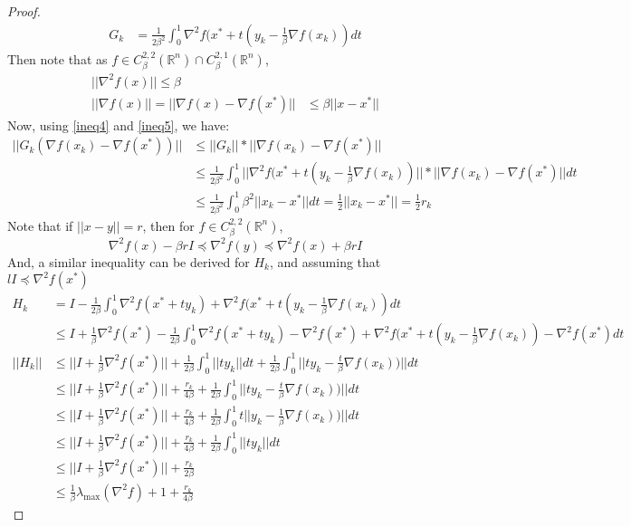 \begin{proof}
\begin{equation}
\begin{aligned}
G_k &= \frac{1}{2\beta^2} \int_0^1 \nabla^2 f(x^* + t(y_k - \frac{1}{\beta} \nabla f(x_k)) dt
\end{aligned}
\end{equation}
Then note that as $f \in C_{\beta}^{2,2}( \mathbb{R}^n) \cap  C_{\beta}^{2,1}( \mathbb{R}^n) $,
\begin{align} \label{ineq4}
|| \nabla^2 f(x) || \leq \beta \\
|| \nabla f(x) || = || \nabla f(x) - \nabla f(x^*) ||& \leq  \beta || x - x^* ||  \label{ineq5}
\end{align}
Now, using \eqref{ineq4} and \eqref{ineq5}, we have:
\begin{equation}
\begin{aligned}
|| G_k ( \nabla f(x_k)  - \nabla f(x^*) ) || &\leq || G_k ||* ||  \nabla f(x_k)  - \nabla f(x^* )|| \\
& \leq  \frac{1}{2\beta^2} \int_0^1 || \nabla^2 f(x^* + t(y_k - \frac{1}{\beta} \nabla f(x_k)) || * ||  \nabla f(x_k)  - \nabla f(x^*) ||  dt \\
& \leq \frac{1}{2 \beta^2} \int_{0}^1 \beta^2 || x_k -  x^* || dt =\frac{1}{2} || x_k - x^* ||  = \frac{1}{2} r_k
\end{aligned}
\end{equation}
Note that if $|| x -y || = r$, then for $f \in C_{\beta}^{2,2}( \mathbb{R}^n)$,
\begin{equation}
 \nabla^2 f(x) - \beta r I \preceq  \nabla^2 f(y) \preceq \nabla^2 f(x) + \beta r I
\end{equation}
And, a similar inequality can be derived for $H_k$, and assuming that $l I \preceq \nabla^2 f(x^*)$
\begin{equation}
\begin{aligned}
 H_k &= I -  \frac{1}{2\beta} \int_0^1 \nabla^2 f(x^* + ty_k) + \nabla^2 f(x^* + t(y_k - \frac{1}{\beta} \nabla f(x_k)) dt  \\
 & \leq I + \frac{1}{\beta} \nabla^2 f(x^*) - \frac{1}{2 \beta}   \int_0^1 \nabla^2 f(x^* + ty_k) -  \nabla^2 f(x^*) + \nabla^2 f(x^* + t(y_k - \frac{1}{\beta} \nabla f(x_k)) -  \nabla^2 f(x^*) dt \\
 ||H_k ||&  \leq || I + \frac{1}{\beta}\nabla^2 f(x^*) || + \frac{1}{2\beta} \int_0^1 || ty_k || dt  + \frac{1}{2\beta} \int_0^1 || t y_k - \frac{t}{\beta} \nabla f(x_k))  || dt \\
 & \leq  || I + \frac{1}{\beta}\nabla^2 f(x^*) || +  \frac{r_k}{4 \beta} + \frac{1}{2\beta} \int_0^1 || t y_k - \frac{t}{\beta} \nabla f(x_k))  || dt \\
 & \leq  || I + \frac{1}{\beta}\nabla^2 f(x^*) || +  \frac{r_k}{4 \beta} + \frac{1}{2\beta} \int_0^1 t || y_k - \frac{1}{\beta} \nabla f(x_k))  || dt \\
 & \leq  || I + \frac{1}{\beta}\nabla^2 f(x^*) || +  \frac{r_k}{4 \beta} + \frac{1}{2\beta} \int_0^1 || t y_k || dt   \\
 & \leq  || I + \frac{1}{\beta}\nabla^2 f(x^*) || +  \frac{r_k}{2 \beta} \\
 & \leq \frac{1}{\beta}  \lambda_{\max}(\nabla^2 f) + 1 + \frac{r_k}{4\beta}
\end{aligned}
\end{equation}


\end{proof}
